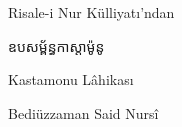 \documentclass{article}
\begin{document}
\begin{center}
\vspace*{18mm}
{\lat\large Risale-i Nur Külliyatı'ndan\par}
\vspace{22mm}
{\kh\fontsize{32}{44}\selectfont ឧបសម្ព័ន្ធកាស្តាម៉ូនូ\par}
\vspace{6mm}
{\lat\LARGE Kastamonu Lâhikası\par}
\vspace{10mm}
\vfill
{\lat\Large Bediüzzaman Said Nursî\par}
\vspace{8mm}
\end{center}
\newpage\null
\end{document}
